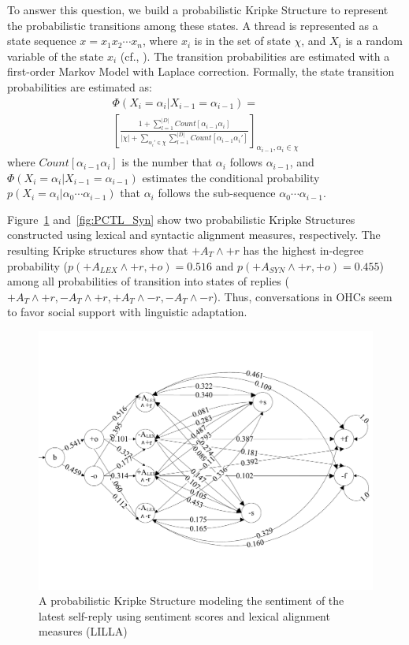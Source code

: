 \documentclass[man,biblatex,floatsintext]{apa6}
\newcommand{\up}{\vspace*{-12pt}}
\begin{document}
To answer this question, we build a probabilistic Kripke Structure to represent the probabilistic transitions among these states.  A thread is represented as a state sequence $x=x_{1}x_{2} \cdots x_{n}$, where $x_{i}$ is in the set of state $\chi$, and $X_{i}$ is a random variable of the state $x_{i}$ (cf.,  \cite{bui2015temporal}). The transition probabilities are estimated with a first-order Markov Model with Laplace correction. Formally, the state transition probabilities are estimated as:
\begin{equation}
\begin{split}
\Phi (X_{i}=\alpha_{i}|X_{i-1}=\alpha_{i-1}) =  \\
\left [ \frac{1+\sum _{l=1}^{|D|} Count \left [ \alpha_{i-1} \alpha_{i} \right ] }{ \left | \chi \right | +\sum_{{\alpha_{i}}' \in \chi } \sum_{l=1}^{|D|} Count \left [ \alpha_{i-1}{\alpha_{i}}' \right ] } \right ]_{\alpha_{i-1},\alpha_{i} \in \chi}
\end{split}
\end{equation} 
where $Count \left[ \alpha_{i-1}\alpha_{i} \right]$ is the number that $\alpha_{i}$ follows $\alpha_{i-1}$, and $\Phi (X_{i}=\alpha_{i}|X_{i-1}=\alpha_{i-1})$ estimates the conditional probability $p(X_{i}=\alpha_{i}|\alpha_{0} \cdots \alpha_{i-1})$ that $\alpha_{i}$ follows the sub-sequence $\alpha_{0} \cdots \alpha_{i-1}$. 

Figure~\ref{fig:PCTL_Lex} and~\ref{fig:PCTL_Syn} show two probabilistic Kripke Structures constructed using lexical and syntactic alignment measures, respectively. The resulting Kripke structures show that $+A_T\wedge+r$ has the highest in-degree probability ($p(+A_{LEX}\wedge+r,+o)=0.516$ and $p(+A_{SYN}\wedge+r,+o)=0.455$) among all  probabilities of transition into states of replies ($+A_T\wedge+r,-A_T\wedge+r,+A_T\wedge-r,-A_T\wedge-r$). Thus, conversations in OHCs seem to favor social support with linguistic adaptation. 

\begin{figure}[!htb]
 \centering
  \includegraphics[width=0.99\linewidth]{Figures/model_lex.pdf}
  \caption{A probabilistic Kripke Structure modeling the sentiment of the latest self-reply using sentiment scores and lexical alignment measures (LILLA)}\label{fig:PCTL_Lex}
  \up
\end{figure}
\end{document}
